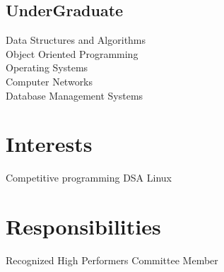 \documentclass[]{deedy-resume-openfont}
\begin{document}
\begin{minipage}[t]{0.33\textwidth}
    \subsection{UnderGraduate}
    Data Structures and Algorithms \\
    Object Oriented Programming \\
    Operating Systems \\
    Computer Networks \\
    Database Management Systems \\
    \sectionsep


    \section{Interests}
    Competitive programming \textbullet{} DSA \textbullet{} Linux
    \sectionsep

    \section{Responsibilities}
    \textbullet{} Recognized High Performers Committee Member


\end{minipage}
\hfill
\end{document}
